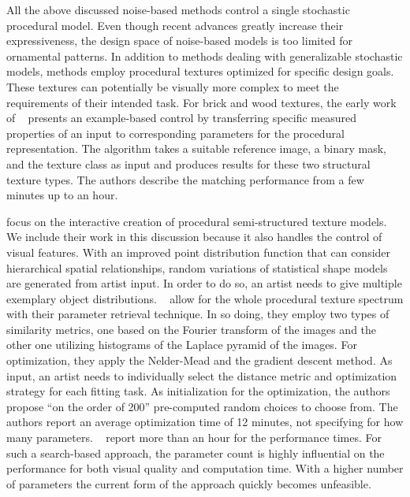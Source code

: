 All the above discussed noise-based methods control a single stochastic procedural model. Even though recent advances greatly increase their expressiveness, the design space of noise-based models is too limited for ornamental patterns. In addition to methods dealing with generalizable stochastic models, methods employ procedural textures optimized for specific design goals. These textures can potentially be visually more complex to meet the requirements of their intended task. For brick and wood textures, the early work of \citeauthor*{lefebvre_2000_ass}~\cite{lefebvre_2000_ass} presents an example-based control by transferring specific measured properties of an input to corresponding parameters for the procedural representation. The algorithm takes a suitable reference image, a binary mask, and the texture class as input and produces results for these two structural texture types. The authors describe the matching performance from a few minutes up to an hour.

\cite{gilet_2012_map} focus on the interactive creation of procedural semi-structured texture models. We include their work in this discussion because it also handles the control of visual features. With an improved point distribution function that can consider hierarchical spatial relationships, random variations of statistical shape models are generated from artist input. In order to do so, an artist needs to give multiple exemplary object distributions.
 \citeauthor*{bourque_2004_ptm}~\cite{bourque_2004_ptm} allow for the whole procedural texture spectrum with their parameter retrieval technique. In so doing, they employ two types of similarity metrics, one based on the Fourier transform of the images and the other one utilizing histograms of the Laplace pyramid of the images. For optimization, they apply the Nelder-Mead and the gradient descent method. As input, an artist needs to individually select the distance metric and optimization strategy for each fitting task. As initialization for the optimization, the authors propose “on the order of 200” pre-computed random choices to choose from. The authors report an average optimization time of 12 minutes, not specifying for how many parameters. \citeauthor*{gilet_2012_mkn}~\cite{gilet_2012_mkn} report more than an hour for the performance times. For such a search-based approach, the parameter count is highly influential on the performance for both visual quality and computation time. With a higher number of parameters the current form of the approach quickly becomes unfeasible.


